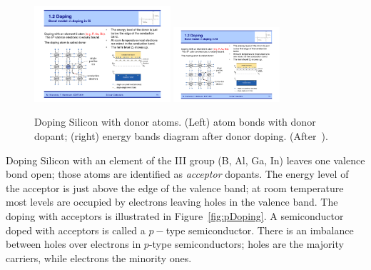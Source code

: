  \begin{figure}[htbp]
   \centering
   \includegraphics[width=0.45\textwidth]{nDopingBonds.pdf} 
   \includegraphics[width=0.35\textwidth]{nDopingBands.pdf} 
   \caption{\label{fig:nDoping}Doping Silicon with donor atoms. (Left) atom bonds with donor dopant; 
   (right) energy bands diagram after donor doping. (After~\cite{Krammer}).}
\end{figure}

Doping Silicon with an element of the III group (B, Al, Ga, In) leaves one valence bond open; 
those atoms are identified  as {\it acceptor} dopants. 
The energy level of the acceptor is just above the edge of the valence band; 
at room temperature most levels are occupied by electrons leaving holes in the valence band.  
The doping with acceptors  is illustrated in Figure~\ref{fig:pDoping}. A semiconductor doped with 
acceptors is called a $p-$type semiconductor. There is an imbalance between 
holes over electrons in $p$-type semiconductors; holes are the majority carriers, while electrons the
minority ones.



